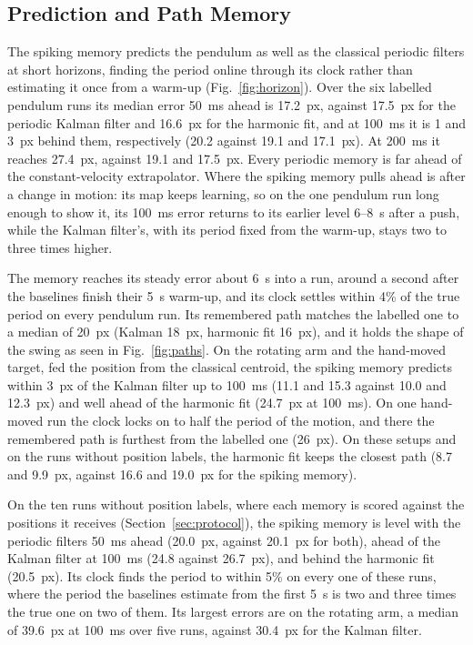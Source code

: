 \documentclass[conference]{IEEEtran}
\begin{document}
\subsection{Prediction and Path Memory}
\label{sec:res-prediction}
The spiking memory predicts the pendulum as well as the classical periodic filters at short horizons, finding the period online through its clock rather than estimating it once from a warm-up (Fig.~\ref{fig:horizon}). Over the six labelled pendulum runs its median error 50~ms ahead is 17.2~px, against 17.5~px for the periodic Kalman filter and 16.6~px for the harmonic fit, and at 100~ms it is 1 and 3~px behind them, respectively (20.2 against 19.1 and 17.1~px). At 200~ms it reaches 27.4~px, against 19.1 and 17.5~px. Every periodic memory is far ahead of the constant-velocity extrapolator. Where the spiking memory pulls ahead is after a change in motion: its map keeps learning, so on the one pendulum run long enough to show it, its 100~ms error returns to its earlier level 6--8~s after a push, while the Kalman filter's, with its period fixed from the warm-up, stays two to three times higher.

The memory reaches its steady error about 6~s into a run, around a second after the baselines finish their 5~s warm-up, and its clock settles within 4\% of the true period on every pendulum run. Its remembered path matches the labelled one to a median of 20~px (Kalman 18~px, harmonic fit 16~px), and it holds the shape of the swing as seen in Fig.~\ref{fig:paths}. On the rotating arm and the hand-moved target, fed the position from the classical centroid, the spiking memory predicts within 3~px of the Kalman filter up to 100~ms (11.1 and 15.3 against 10.0 and 12.3~px) and well ahead of the harmonic fit (24.7~px at 100~ms). On one hand-moved run the clock locks on to half the period of the motion, and there the remembered path is furthest from the labelled one (26~px). On these setups and on the runs without position labels, the harmonic fit keeps the closest path (8.7 and 9.9~px, against 16.6 and 19.0~px for the spiking memory).

On the ten runs without position labels, where each memory is scored against the positions it receives (Section~\ref{sec:protocol}), the spiking memory is level with the periodic filters 50~ms ahead (20.0~px, against 20.1~px for both), ahead of the Kalman filter at 100~ms (24.8 against 26.7~px), and behind the harmonic fit (20.5~px). Its clock finds the period to within 5\% on every one of these runs, where the period the baselines estimate from the first 5~s is two and three times the true one on two of them. Its largest errors are on the rotating arm, a median of 39.6~px at 100~ms over five runs, against 30.4~px for the Kalman filter.
\end{document}
